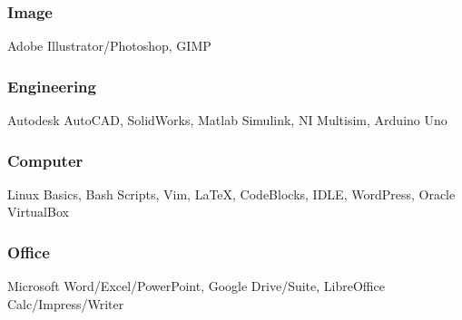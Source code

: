 \documentclass{article}
\begin{document}
\begin{addmargin}[2em]{0em}
\subsubsection{Image}
Adobe Illustrator/Photoshop, GIMP

\subsubsection{Engineering}
Autodesk AutoCAD, SolidWorks, Matlab Simulink, NI Multisim, Arduino Uno

\subsubsection{Computer}

Linux Basics, Bash Scripts, Vim, {\LaTeX}, CodeBlocks, IDLE, WordPress, Oracle VirtualBox 

\subsubsection{Office}
Microsoft Word/Excel/PowerPoint, Google Drive/Suite, LibreOffice Calc/Impress/Writer

\end{addmargin}






\end{document}
